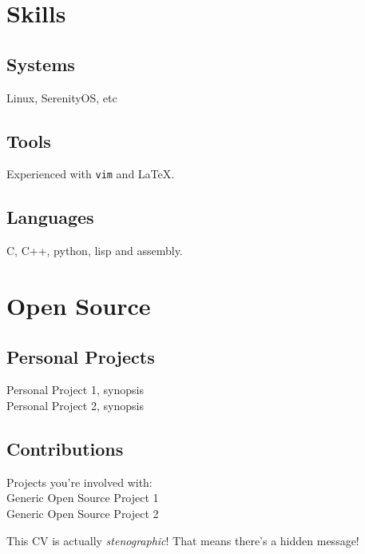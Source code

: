 \documentclass[a4paper,10pt]{article}
\begin{document}
\begin{multicols}{2}
\section{Skills}

\subsection{Systems}
Linux, SerenityOS, etc

\subsection{Tools}
Experienced with \texttt{vim} and \LaTeX.

\subsection{Languages}
C, C++, python, lisp and assembly.\\

\section{Open Source}

\subsection{Personal Projects}
Personal Project 1, synopsis \\
Personal Project 2, synopsis

\subsection{Contributions}
Projects you're involved with: \\
Generic Open Source Project 1 \\
Generic Open Source Project 2 \\

\end{multicols}

\color{white}This CV is actually \emph{stenographic}! That means there's a hidden message!
\end{document}
